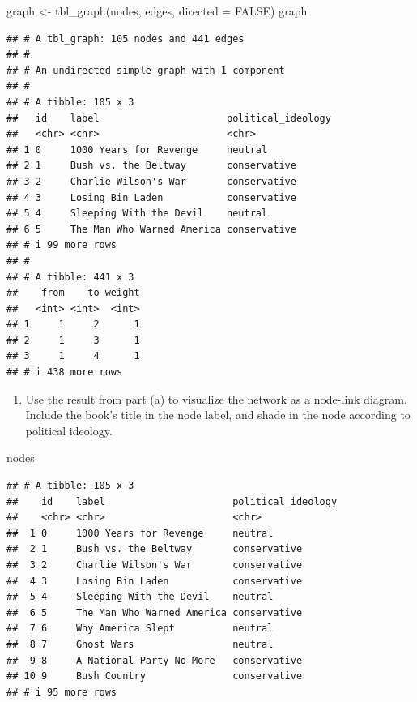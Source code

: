 \documentclass[
]{article}
\newenvironment{Shaded}{\begin{snugshade}}{\end{snugshade}}
\newcommand{\AttributeTok}[1]{\textcolor[rgb]{0.77,0.63,0.00}{#1}}
\newcommand{\ConstantTok}[1]{\textcolor[rgb]{0.00,0.00,0.00}{#1}}
\newcommand{\FunctionTok}[1]{\textcolor[rgb]{0.00,0.00,0.00}{#1}}
\newcommand{\NormalTok}[1]{#1}
\newcommand{\OtherTok}[1]{\textcolor[rgb]{0.56,0.35,0.01}{#1}}
\providecommand{\tightlist}{%
  \setlength{\itemsep}{0pt}\setlength{\parskip}{0pt}}
\begin{document}
\begin{Shaded}
\begin{Highlighting}[]
\NormalTok{graph }\OtherTok{\textless{}{-}} \FunctionTok{tbl\_graph}\NormalTok{(nodes, edges, }\AttributeTok{directed =} \ConstantTok{FALSE}\NormalTok{)}
\NormalTok{graph}
\end{Highlighting}
\end{Shaded}

\begin{verbatim}
## # A tbl_graph: 105 nodes and 441 edges
## #
## # An undirected simple graph with 1 component
## #
## # A tibble: 105 x 3
##   id    label                      political_ideology
##   <chr> <chr>                      <chr>             
## 1 0     1000 Years for Revenge     neutral           
## 2 1     Bush vs. the Beltway       conservative      
## 3 2     Charlie Wilson's War       conservative      
## 4 3     Losing Bin Laden           conservative      
## 5 4     Sleeping With the Devil    neutral           
## 6 5     The Man Who Warned America conservative      
## # i 99 more rows
## #
## # A tibble: 441 x 3
##    from    to weight
##   <int> <int>  <int>
## 1     1     2      1
## 2     1     3      1
## 3     1     4      1
## # i 438 more rows
\end{verbatim}

\begin{enumerate}
\def\labelenumi{\alph{enumi}.}
\setcounter{enumi}{1}
\tightlist
\item
  Use the result from part (a) to visualize the network as a node-link
  diagram. Include the book's title in the node label, and shade in the
  node according to political ideology.
\end{enumerate}

\begin{Shaded}
\begin{Highlighting}[]
\NormalTok{nodes}
\end{Highlighting}
\end{Shaded}

\begin{verbatim}
## # A tibble: 105 x 3
##    id    label                      political_ideology
##    <chr> <chr>                      <chr>             
##  1 0     1000 Years for Revenge     neutral           
##  2 1     Bush vs. the Beltway       conservative      
##  3 2     Charlie Wilson's War       conservative      
##  4 3     Losing Bin Laden           conservative      
##  5 4     Sleeping With the Devil    neutral           
##  6 5     The Man Who Warned America conservative      
##  7 6     Why America Slept          neutral           
##  8 7     Ghost Wars                 neutral           
##  9 8     A National Party No More   conservative      
## 10 9     Bush Country               conservative      
## # i 95 more rows
\end{verbatim}
\end{document}
